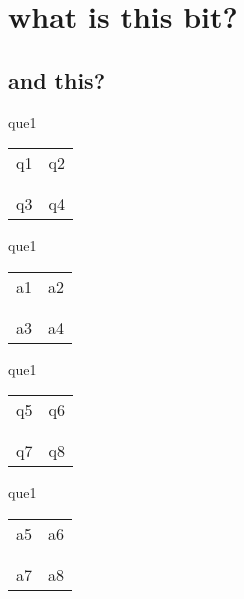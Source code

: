 \documentclass[13.5pt, varwidth=true]{beamer}
\begin{document}
\date{}

\section[topic]{what is this bit?}
\subsection[title]{and this?}


\begin{frame}[shrink=19,fragile]
	\begin{beamercolorbox}[rounded=true, left, shadow=true,wd=14.8cm]{que1}
		\begin{tabular}{m{7cm} | m{7cm}}
			\parbox{7cm}{q1 } & \parbox{7cm}{q2 } \\\\
			\hline
			\\ \parbox{7cm}{q3 } & \parbox{7cm}{q4 } \\
		\end{tabular}
	\end{beamercolorbox}
\end{frame}
\begin{frame}[shrink=19,fragile]
	\begin{beamercolorbox}[rounded=true, left, shadow=true,wd=14.8cm]{que1}
		\begin{tabular}{p{7cm} | p{7cm}}
			\textcolor{ared}{a1 }  & \textcolor{ared}{a2 } \\\\
			\hline
			\\ \textcolor{ared}{a3 }  & \textcolor{ared}{a4 } \\
		\end{tabular}
	\end{beamercolorbox}
\end{frame}

\begin{frame}[shrink=19,fragile]
	\begin{beamercolorbox}[rounded=true, left, shadow=true,wd=14.8cm]{que1}
		\begin{tabular}{p{7cm} | p{7cm}}
			\parbox{7cm}{q5 } & \parbox{7cm}{q6 } \\\\ 
			\hline
			\\ \parbox{7cm}{q7 } & \parbox{7cm}{q8 } \\
		\end{tabular}
	\end{beamercolorbox}
\end{frame}
\begin{frame}[shrink=19,fragile]
	\begin{beamercolorbox}[rounded=true, left, shadow=true,wd=14.8cm]{que1}
		\begin{tabular}{p{7cm} | p{7cm}}
			\textcolor{ared}{a5 }  & \textcolor{ared}{a6 } \\\\ 
			\hline
			\\ \textcolor{ared}{a7 }  & \textcolor{ared}{a8 } \\
		\end{tabular}
	\end{beamercolorbox}
\end{frame}
\end{document}
